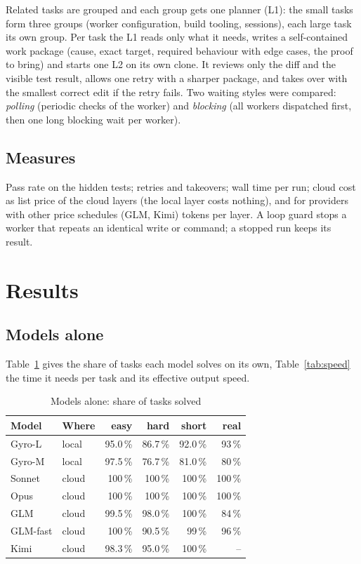 Related tasks are grouped and each group gets one planner (L1): the small tasks form three groups (worker
configuration, build tooling, sessions), each large task its own group. Per task the L1 reads only what it needs,
writes a self-contained work package (cause, exact target, required behaviour with edge cases, the proof to bring)
and starts one L2 on its own clone. It reviews only the diff and the visible test result, allows one retry with a
sharper package, and takes over with the smallest correct edit if the retry fails. Two waiting styles were
compared: \emph{polling} (periodic checks of the worker) and \emph{blocking} (all workers dispatched first, then
one long blocking wait per worker).

\subsection{Measures}

Pass rate on the hidden tests; retries and takeovers; wall time per run; cloud cost as list price of the cloud
layers (the local layer costs nothing), and for providers with other price schedules (GLM, Kimi) tokens per layer.
A loop guard stops a worker that repeats an identical write or command; a stopped run keeps its result.

\section{Results}\label{sec:results}

\subsection{Models alone}

Table~\ref{tab:alone} gives the share of tasks each model solves on its own, Table~\ref{tab:speed} the time it
needs per task and its effective output speed.

\begin{table}[H]
\centering
\small
\caption{Models alone: share of tasks solved}\label{tab:alone}
\begin{tabular}{llrrrr}
\toprule
Model & Where & easy & hard & short & real \\
\midrule
Gyro-L & local & 95.0\,\% & 86.7\,\% & 92.0\,\% & 93\,\% \\
Gyro-M & local & 97.5\,\% & 76.7\,\% & 81.0\,\% & 80\,\% \\
Sonnet & cloud & 100\,\% & 100\,\% & 100\,\% & 100\,\% \\
Opus & cloud & 100\,\% & 100\,\% & 100\,\% & 100\,\% \\
GLM & cloud & 99.5\,\% & 98.0\,\% & 100\,\% & 84\,\% \\
GLM-fast & cloud & 100\,\% & 90.5\,\% & 99\,\% & 96\,\% \\
Kimi & cloud & 98.3\,\% & 95.0\,\% & 100\,\% & -- \\
\bottomrule
\end{tabular}
\par{}
\end{table}


